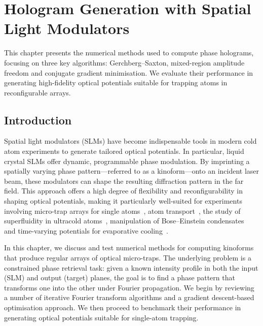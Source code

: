 \documentclass[../Thesis-IJspeert.tex]{subfiles}
\begin{document}
\graphicspath{ {"Hologram Generation with Spatial Light Modulators/figs/"} }

\chapter{Hologram Generation with Spatial Light Modulators}
\label{chap:HologramGenerationwithSpatialLightModulators}
This chapter presents the numerical methods used to compute phase holograms, focusing on three key algorithms: Gerchberg--Saxton, mixed-region amplitude freedom and conjugate gradient minimisation. We evaluate their performance in generating high-fidelity optical potentials suitable for trapping atoms in reconfigurable arrays.

\section{Introduction}
Spatial light modulators (SLMs) have become indispensable tools in modern cold atom experiments to generate tailored optical potentials. In particular, liquid crystal SLMs offer dynamic, programmable phase modulation. By imprinting a spatially varying phase pattern---referred to as a kinoform---onto an incident laser beam, these modulators can shape the resulting diffraction pattern in the far field. This approach offers a high degree of flexibility and reconfigurability in shaping optical potentials, making it particularly well-suited for experiments involving micro-trap arrays for single atoms~\cite{Bergamini2004,nogrette2014, Barredo2018,Schymik2020}, atom transport~\cite{Kim2016,Kim2019}, the study of superfluidity in ultracold atoms~\cite{Bruce2011a}, manipulation of Bose--Einstein condensates~\cite{Boyer2006} and time-varying potentials for evaporative cooling~\cite{Bruce2011b}.

In this chapter, we discuss and test numerical methods for computing kinoforms that produce regular arrays of optical micro-traps. The underlying problem is a constrained phase retrieval task: given a known intensity profile in both the input (SLM) and output (target) planes, the goal is to find a phase pattern that transforms one into the other under Fourier propagation. We begin by reviewing a number of iterative Fourier transform algorithms and a gradient descent-based optimisation approach. We then proceed to benchmark their performance in generating optical potentials suitable for single-atom trapping.
\end{document}
